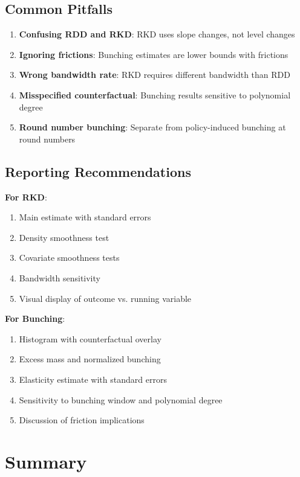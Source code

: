 \subsection{Common Pitfalls}

\begin{enumerate}
    \item \textbf{Confusing RDD and RKD}: RKD uses slope changes, not level changes
    \item \textbf{Ignoring frictions}: Bunching estimates are lower bounds with frictions
    \item \textbf{Wrong bandwidth rate}: RKD requires different bandwidth than RDD
    \item \textbf{Misspecified counterfactual}: Bunching results sensitive to polynomial degree
    \item \textbf{Round number bunching}: Separate from policy-induced bunching at round numbers
\end{enumerate}

\subsection{Reporting Recommendations}

\textbf{For RKD}:
\begin{enumerate}
    \item Main estimate with standard errors
    \item Density smoothness test
    \item Covariate smoothness tests
    \item Bandwidth sensitivity
    \item Visual display of outcome vs. running variable
\end{enumerate}

\textbf{For Bunching}:
\begin{enumerate}
    \item Histogram with counterfactual overlay
    \item Excess mass and normalized bunching
    \item Elasticity estimate with standard errors
    \item Sensitivity to bunching window and polynomial degree
    \item Discussion of friction implications
\end{enumerate}

\section{Summary}
\label{sec:kink_summary}


